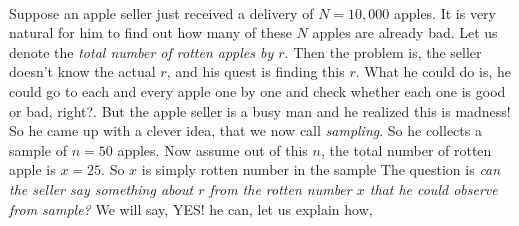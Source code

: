 \documentclass[ 11pt,%
				a4paper,%
				twoside,%
				headinclude,%
				footinclude = true,%
				cleardoublepage = empty,%
				reqno]{scrbook}
\begin{document}
\begin{example}~\label{ex:rottenapples}

Suppose an apple seller just received a delivery of $N = 10,000$ apples. It is very natural for him to find out how many of these $N$ apples are already bad. Let us denote the \emph{total number of rotten apples by $r$}. Then the problem is, the seller doesn't know the actual $r$, and his quest is finding this $r$. What he could do is, he could go to each and every apple one by one and check whether each one is good or bad, right?. But the apple seller is a busy man and he realized this is madness! So he came up with a clever idea, that we now call \emph{sampling}. So he collects a sample of $n = 50$ apples. Now assume out of this $n$, the total number of rotten apple is $x = 25$. So $x$ is simply rotten number in the sample The question is \emph{can the seller say something about $r$ from the rotten number $x$ that he could observe from sample?} We will say, YES! he can, let us explain how,

\marginbreak{30pt}
\marginbreak{150pt}


\end{example}
\end{document}
